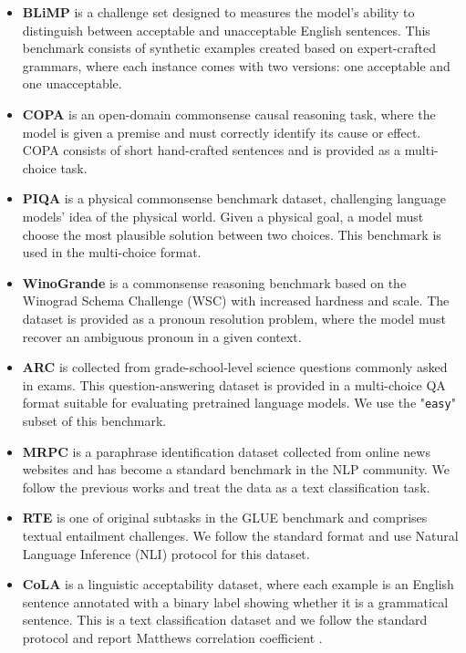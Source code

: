 \documentclass[letterpaper, 12pt]{report}
\begin{document}
\begin{itemize}
    \item \textbf{BLiMP} \citep{warstadt-etal-2020-BLiMP-benchmark}
    is a challenge set designed to measures the model's ability to distinguish between acceptable and unacceptable English sentences. This benchmark consists of synthetic examples created based on expert-crafted grammars, where each instance comes with two versions: one acceptable and one unacceptable.
    \item \textbf{COPA} \citep{Gordon2012:COPA} is an open-domain commonsense causal reasoning task, where the model is given a premise and must correctly identify its cause or effect. COPA consists of short hand-crafted sentences and is provided as a multi-choice task.
    \item  \textbf{PIQA} \citep{Bisk2020:PIQA} is a physical commonsense benchmark dataset, challenging language models' idea of the physical world. Given a physical goal, a model must choose the most plausible solution between two choices. This benchmark is used in the multi-choice format.
    \item \textbf{WinoGrande} \citep{Sakaguchi2020:WINOGRANDE} is a commonsense reasoning benchmark based on the Winograd Schema Challenge (WSC) \citep{Levesque2011:WSC} with increased hardness and scale. The dataset is provided as a pronoun resolution problem, where the model must recover an ambiguous pronoun in a given context.

    \item \textbf{ARC} \citep{Clark2018:ARC}  is collected from grade-school-level science questions commonly asked in exams. This question-answering dataset is provided in a multi-choice QA format suitable for evaluating pretrained language models. We use the "\texttt{easy}" subset of this benchmark.

    \item \textbf{MRPC} \citep{Dolan2005:MRPC} is a paraphrase identification dataset collected from online news websites and has become a standard benchmark in the NLP community. We follow the previous works and treat the data as a text classification task.
    \item \textbf{RTE} \citep{Dagan2005:RTE} is one of original subtasks in the GLUE benchmark and comprises textual entailment challenges. We follow the standard format and use Natural Language Inference (NLI) protocol for this dataset.

    \item \textbf{CoLA} \citep{warstadt2018:CoLA} is a linguistic acceptability dataset, where each example is an English sentence annotated with a binary label showing whether it is a grammatical sentence. This is a text classification dataset and we follow the standard protocol and report Matthews correlation coefficient \citep{Matthews1975:mcc}.

\end{itemize}
\end{document}

